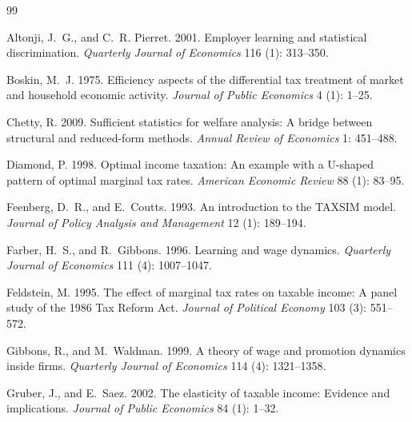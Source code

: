 \documentclass[12pt]{article}
\theoremstyle{definition}
\theoremstyle{remark}
\begin{document}
\newpage

\begin{thebibliography}{99}

Altonji, J.~G., and C.~R. Pierret. 2001.
\newblock Employer learning and statistical discrimination.
\newblock \emph{Quarterly Journal of Economics} 116 (1): 313--350.

Boskin, M.~J. 1975.
\newblock Efficiency aspects of the differential tax treatment of market and
  household economic activity.
\newblock \emph{Journal of Public Economics} 4 (1): 1--25.

Chetty, R. 2009.
\newblock Sufficient statistics for welfare analysis: A bridge between
  structural and reduced-form methods.
\newblock \emph{Annual Review of Economics} 1: 451--488.

Diamond, P. 1998.
\newblock Optimal income taxation: An example with a U-shaped pattern of
  optimal marginal tax rates.
\newblock \emph{American Economic Review} 88 (1): 83--95.

Feenberg, D.~R., and E.~Coutts. 1993.
\newblock An introduction to the TAXSIM model.
\newblock \emph{Journal of Policy Analysis and Management} 12 (1): 189--194.

Farber, H.~S., and R.~Gibbons. 1996.
\newblock Learning and wage dynamics.
\newblock \emph{Quarterly Journal of Economics} 111 (4): 1007--1047.

Feldstein, M. 1995.
\newblock The effect of marginal tax rates on taxable income: A panel study of
  the 1986 Tax Reform Act.
\newblock \emph{Journal of Political Economy} 103 (3): 551--572.

Gibbons, R., and M.~Waldman. 1999.
\newblock A theory of wage and promotion dynamics inside firms.
\newblock \emph{Quarterly Journal of Economics} 114 (4): 1321--1358.

Gruber, J., and E.~Saez. 2002.
\newblock The elasticity of taxable income: Evidence and implications.
\newblock \emph{Journal of Public Economics} 84 (1): 1--32.


\end{thebibliography}
\end{document}
